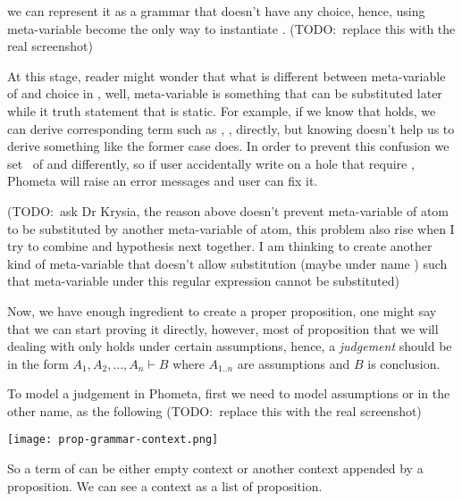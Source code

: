 \documentclass[master.tex]{subfiles}
\begin{document}
we can represent
it as a grammar that doesn't have any choice, hence, using meta-variable become
the only way to instantiate . (TODO:\ replace this with the real
screenshot)

At this stage, reader might wonder that what is different between meta-variable
of  and  choice in , well, meta-variable is
something that can be substituted later while  it truth statement that
is static. For example,
if we know that  holds, we can derive
corresponding term such as \bat{\propTop\propOr\bat{\propNot\propTop}},
,
directly, but knowing
 doesn't
help us to derive something like the former case does. In order to prevent this
confusion we set \kVarRegex\ of  and  differently, so if
user accidentally write  on a hole that require , Phometa
will raise an error messages and user can fix it.

(TODO:\ ask Dr Krysia, the reason above doesn't prevent meta-variable of atom to
be substituted by another meta-variable of atom, this problem also rise when I
try to combine  and hypothesis next together. I am
thinking to create another kind of meta-variable that doesn't allow substitution
(maybe under name ) such that meta-variable under this regular
expression cannot be substituted)

Now, we have enough ingredient to create a proper proposition, one might say
that we can start proving it directly, however, most of proposition that we will
dealing with only holds under certain assumptions, hence, a \emph{judgement}
should be in the form $A_1, A_2, ..., A_n \vdash B$ where $A_{1..n}$ are
assumptions and $B$ is conclusion.

To model a judgement in Phometa, first we need to model assumptions or in the
other name,  as the following (TODO:\ replace this with the real
screenshot)

\centerline{\texttt{[image: prop-grammar-context.png]}}

\newcommand{\propEmptyContext}{\bat{\pifmt{$\epsilon$}}}

So a term of  can be either empty context or another context
appended by a proposition. We can see a context as a list of proposition.
\end{document}
